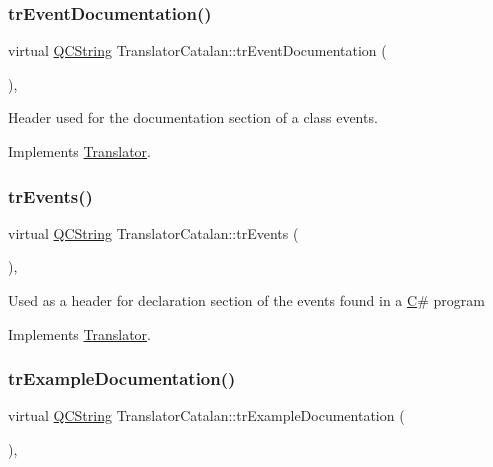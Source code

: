 \subsubsection{\texorpdfstring{trEventDocumentation()}{trEventDocumentation()}}
{\footnotesize\ttfamily virtual \mbox{\hyperlink{class_q_c_string}{Q\+C\+String}} Translator\+Catalan\+::tr\+Event\+Documentation (\begin{DoxyParamCaption}{ }\end{DoxyParamCaption})\hspace{0.3cm}{\ttfamily [inline]}, {\ttfamily [virtual]}}

Header used for the documentation section of a class\textquotesingle{} events. 

Implements \mbox{\hyperlink{class_translator}{Translator}}.

\mbox{\label{class_translator_catalan_ad92e99fa47322a6e24c57e8aa72c52a3}} 
\subsubsection{\texorpdfstring{trEvents()}{trEvents()}}
{\footnotesize\ttfamily virtual \mbox{\hyperlink{class_q_c_string}{Q\+C\+String}} Translator\+Catalan\+::tr\+Events (\begin{DoxyParamCaption}{ }\end{DoxyParamCaption})\hspace{0.3cm}{\ttfamily [inline]}, {\ttfamily [virtual]}}

Used as a header for declaration section of the events found in a \mbox{\hyperlink{class_c}{C}}\# program 

Implements \mbox{\hyperlink{class_translator}{Translator}}.

\mbox{\label{class_translator_catalan_a07acb3ab34483733d5f3399710335e1d}} 
\subsubsection{\texorpdfstring{trExampleDocumentation()}{trExampleDocumentation()}}
{\footnotesize\ttfamily virtual \mbox{\hyperlink{class_q_c_string}{Q\+C\+String}} Translator\+Catalan\+::tr\+Example\+Documentation (\begin{DoxyParamCaption}{ }\end{DoxyParamCaption})\hspace{0.3cm}{\ttfamily [inline]}, {\ttfamily [virtual]}}

